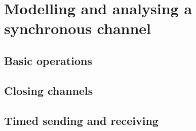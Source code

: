 \section{Modelling and analysing a synchronous channel}

\subsection{Basic operations}


\subsection{Closing channels}


\subsection{Timed sending and receiving}
